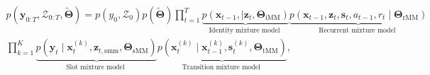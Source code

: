 \documentclass[10pt]{article}
\begin{document}
\[
\begin{array}{r}
p\left(\mathbf{y}_{0: T}, \mathcal{Z}_{0: T}, \tilde{\boldsymbol{\Theta}}\right)=p\left(y_{0}, \mathcal{Z}_{0}\right) p(\tilde{\boldsymbol{\Theta}}) \prod_{t=1}^{T} \underbrace{p\left(\mathbf{x}_{t-1}, \mid \mathbf{z}_{t}, \boldsymbol{\Theta}_{\mathrm{iMM}}\right)}_{\text {Identity mixture model }} \underbrace{p\left(\mathbf{x}_{t-1}, \mathbf{z}_{t}, \mathbf{s}_{t}, a_{t-1}, r_{t} \mid \boldsymbol{\Theta}_{\mathrm{rMM}}\right)}_{\text {Recurrent mixture model }} \\
\prod_{k=1}^{K} \underbrace{p\left(\mathbf{y}_{t} \mid \mathbf{x}_{t}^{(k)}, \mathbf{z}_{t, \mathrm{smm}}, \boldsymbol{\Theta}_{\mathrm{sMM}}\right)}_{\text {Slot mixture model }} \underbrace{p\left(\mathbf{x}_{t}^{(k)} \mid \mathbf{x}_{t-1}^{(k)}, \mathbf{s}_{t}^{(k)}, \boldsymbol{\Theta}_{\mathrm{tMM}}\right)}_{\text {Transition mixture model }}, \tag{1}
\end{array}
\]
\end{document}
